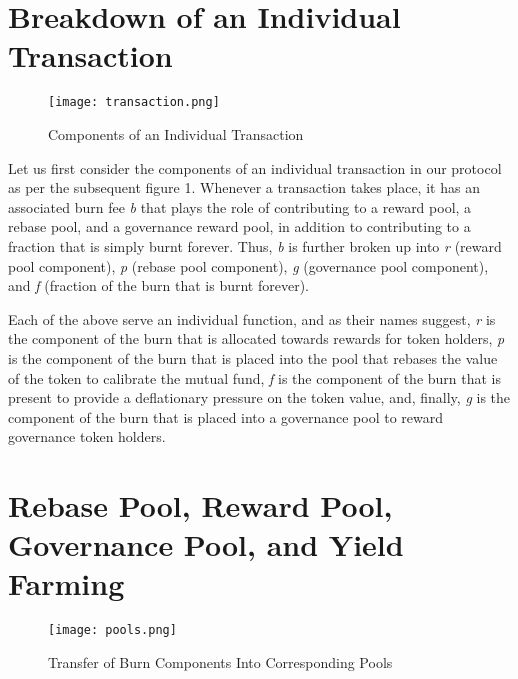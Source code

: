\documentclass[12pt]{article}
\begin{document}
\section{Breakdown of an Individual Transaction}
    
    \vspace{0.25cm}
    
    \begin{figure}[!htb]
        \centering
        \texttt{[image: transaction.png]}
        \caption{Components of an Individual Transaction}
        \label{fig:my_label}
    \end{figure}
    
    \indent
    Let us first consider the components of an individual transaction in our protocol as per the subsequent figure 1. Whenever a transaction takes place, it has an associated burn fee \emph{b} that plays the role of contributing to a reward pool, a rebase pool, and a governance reward pool, in addition to contributing to a fraction that is simply burnt forever. Thus, \emph{b} is further broken up into \emph{r} (reward pool component), \emph{p} (rebase pool component), \emph{g} (governance pool component), and \emph{f} (fraction of the burn that is burnt forever). \par
    
    \vspace{0.15cm}
    
    \indent
    Each of the above serve an individual function, and as their names suggest, \emph{r} is the component of the burn that is allocated towards rewards for token holders, \emph{p} is the component of the burn that is placed into the pool that rebases the value of the token to calibrate the mutual fund, \emph{f} is the component of the burn that is present to provide a deflationary pressure on the token value, and, finally, \emph{g} is the component of the burn that is placed into a governance pool to reward governance token holders. \par
    
    \nopagebreak

    
\section{Rebase Pool, Reward Pool, Governance Pool, and Yield Farming}

    
    \begin{figure}[!htb]
        \centering
        \texttt{[image: pools.png]}
        \caption{Transfer of Burn Components Into Corresponding Pools}
        \label{fig:my_label}
    \end{figure}    
\end{document}
